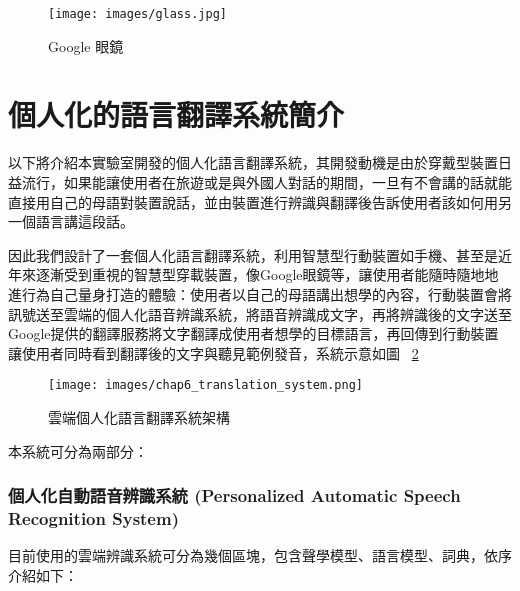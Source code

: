 \begin{figure}
\centering
\texttt{[image: images/glass.jpg]}
\caption{Google 眼鏡} \label{fig:glass}
\end{figure}

\section{個人化的語言翻譯系統簡介}

以下將介紹本實驗室開發的個人化語言翻譯系統，其開發動機是由於穿戴型裝置日益流行，如果能讓使用者在旅遊或是與外國人對話的期間，一旦有不會講的話就能直接用自己的母語對裝置說話，並由裝置進行辨識與翻譯後告訴使用者該如何用另一個語言講這段話。

因此我們設計了一套個人化語言翻譯系統，利用智慧型行動裝置如手機、甚至是近年來逐漸受到重視的智慧型穿載裝置，像Google眼鏡等，讓使用者能隨時隨地地進行為自己量身打造的體驗：使用者以自己的母語講出想學的內容，行動裝置會將訊號送至雲端的個人化語音辨識系統，將語音辨識成文字，再將辨識後的文字送至Google提供的翻譯服務將文字翻譯成使用者想學的目標語言，再回傳到行動裝置讓使用者同時看到翻譯後的文字與聽見範例發音，系統示意如圖 ~\ref{fig:chap6_translation_system}

\begin{figure}
\centering
\texttt{[image: images/chap6\_translation\_system.png]}
\caption{雲端個人化語言翻譯系統架構} \label{fig:chap6_translation_system}
\end{figure}

本系統可分為兩部分：

\subsubsection{個人化自動語音辨識系統 (Personalized Automatic Speech Recognition System)} 
目前使用的雲端辨識系統可分為幾個區塊，包含聲學模型、語言模型、詞典，依序介紹如下：

